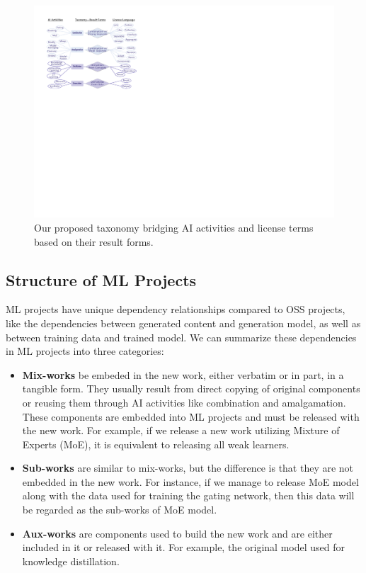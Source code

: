 \begin{figure}[t]
    \centering
    \includegraphics[width=\linewidth]{fig/taxonomy.pdf}
    \caption{Our proposed taxonomy bridging AI activities and license terms based on their result forms.}
    \Description{}
    \label{fig:tax}
\end{figure}


\subsection{Structure of ML Projects}
ML projects have unique dependency relationships compared to OSS projects, like the dependencies between generated content and generation model, as well as between training data and trained model.
We can summarize these dependencies in ML projects into three categories:
\begin{itemize}[leftmargin=*]
    \item \textbf{Mix-works} be embeded in the new work, either verbatim or in part, in a tangible form.
    They usually result from direct copying of original components or reusing them through AI activities like combination and amalgamation. These components are embedded into ML projects and must be released with the new work. 
    For example, if we release a new work utilizing Mixture of Experts (MoE), it is equivalent to releasing all weak learners.

    \item \textbf{Sub-works} are similar to mix-works, but the difference is that they are not embedded in the new work. For instance, if we manage to release MoE model along with the data used for training the gating network, then this data will be regarded as the sub-works of MoE model.
    
    \item \textbf{Aux-works} are components used to build the new work and are either included in it or released with it. For example, the original model used for knowledge distillation.
\end{itemize}

